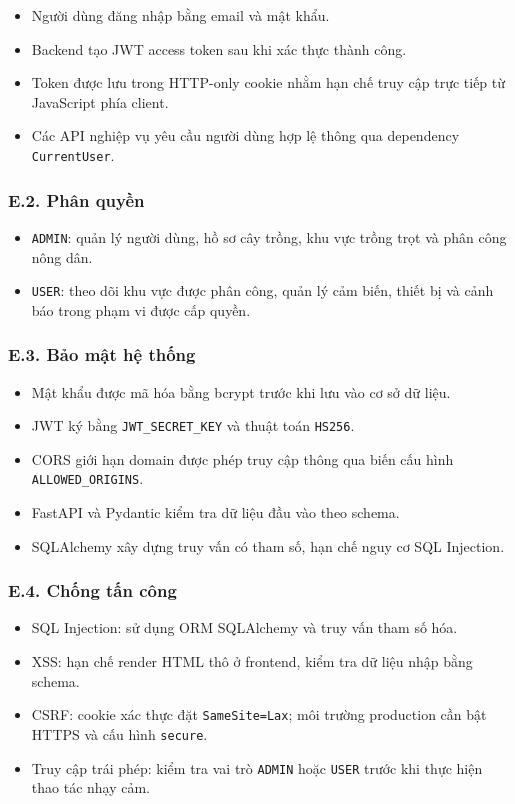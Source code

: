 \documentclass[13pt,a4paper]{extarticle}
\numberwithin{figure}{section}
\numberwithin{table}{section}
\begin{document}
	\noindent
	\begin{itemize}
		\item Người dùng đăng nhập bằng email và mật khẩu.
		\item Backend tạo JWT access token sau khi xác thực thành công.
		\item Token được lưu trong HTTP-only cookie nhằm hạn chế truy cập trực tiếp từ JavaScript phía client.
		\item Các API nghiệp vụ yêu cầu người dùng hợp lệ thông qua dependency \texttt{CurrentUser}.
	\end{itemize}
	
	\subsubsection*{E.2. Phân quyền}
	
	\noindent
	\begin{itemize}
		\item \texttt{ADMIN}: quản lý người dùng, hồ sơ cây trồng, khu vực trồng trọt và phân công nông dân.
		\item \texttt{USER}: theo dõi khu vực được phân công, quản lý cảm biến, thiết bị và cảnh báo trong phạm vi được cấp quyền.
	\end{itemize}
	
	\subsubsection*{E.3. Bảo mật hệ thống}
	
	\noindent
	\begin{itemize}
		\item Mật khẩu được mã hóa bằng bcrypt trước khi lưu vào cơ sở dữ liệu.
		\item JWT ký bằng \texttt{JWT\_SECRET\_KEY} và thuật toán \texttt{HS256}.
		\item CORS giới hạn domain được phép truy cập thông qua biến cấu hình \texttt{ALLOWED\_ORIGINS}.
		\item FastAPI và Pydantic kiểm tra dữ liệu đầu vào theo schema.
		\item SQLAlchemy xây dựng truy vấn có tham số, hạn chế nguy cơ SQL Injection.
	\end{itemize}
	
	\subsubsection*{E.4. Chống tấn công}
	
	\noindent
	\begin{itemize}
		\item SQL Injection: sử dụng ORM SQLAlchemy và truy vấn tham số hóa.
		\item XSS: hạn chế render HTML thô ở frontend, kiểm tra dữ liệu nhập bằng schema.
		\item CSRF: cookie xác thực đặt \texttt{SameSite=Lax}; môi trường production cần bật HTTPS và cấu hình \texttt{secure}.
		\item Truy cập trái phép: kiểm tra vai trò \texttt{ADMIN} hoặc \texttt{USER} trước khi thực hiện thao tác nhạy cảm.
	\end{itemize}
	
\end{document}
